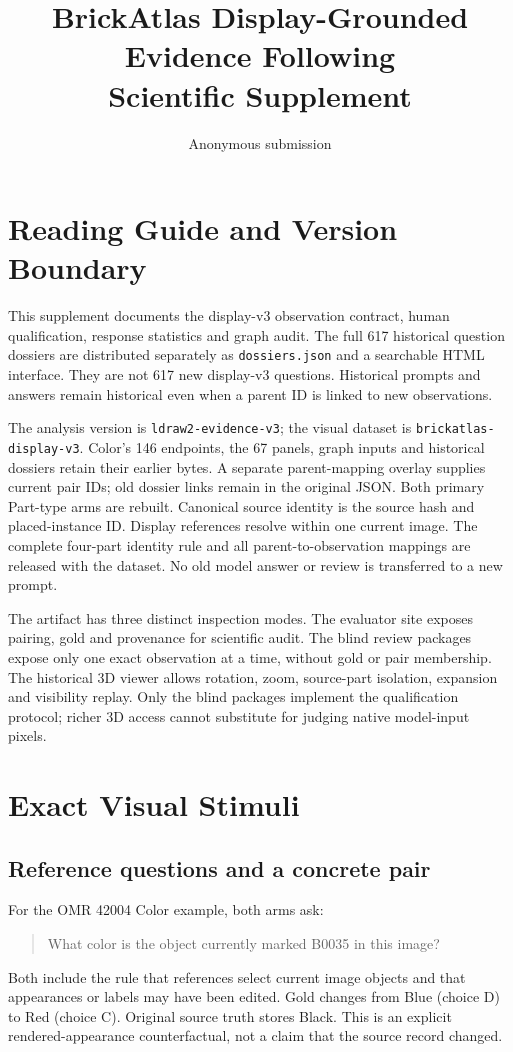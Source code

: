\documentclass[10pt,twocolumn,letterpaper]{article}
\title{BrickAtlas Display-Grounded Evidence Following\\Scientific Supplement}
\author{Anonymous submission}
\begin{document}
\maketitle
\raggedbottom

\section{Reading Guide and Version Boundary}
This supplement documents the display-v3 observation contract,
human qualification, response statistics and graph audit. The full
617 historical question dossiers are distributed separately as
\texttt{dossiers.json} and a searchable HTML interface. They are not
617 new display-v3 questions. Historical prompts and answers remain
historical even when a parent ID is linked to new observations.

The analysis version is \texttt{ldraw2-evidence-v3}; the visual dataset
is \texttt{brickatlas-display-v3}. Color's 146 endpoints, the 67 panels,
graph inputs and historical dossiers retain their earlier bytes.
A separate parent-mapping overlay supplies current pair IDs; old
dossier links remain in the original JSON. Both primary Part-type
arms are rebuilt. Canonical source identity is the
source hash and placed-instance ID. Display references resolve within
one current image. The complete four-part identity rule and all
parent-to-observation mappings are released with the dataset.
No old model answer or review is transferred to a new prompt.

The artifact has three distinct inspection modes. The evaluator site
exposes pairing, gold and provenance for scientific audit. The blind
review packages expose only one exact observation at a time, without
gold or pair membership. The historical 3D viewer allows rotation,
zoom, source-part isolation, expansion and visibility replay.
Only the blind packages implement the qualification protocol; richer
3D access cannot substitute for judging native model-input pixels.

\section{Exact Visual Stimuli}
\subsection{Reference questions and a concrete pair}
For the OMR 42004 Color example, both arms ask:
\begin{quote}\small
What color is the object currently marked B0035 in this image?
\end{quote}
Both include the rule that references select current image objects and
that appearances or labels may have been edited. Gold changes from
Blue (choice D) to Red (choice C). Original source truth stores Black.
This is an explicit rendered-appearance counterfactual, not a claim
that the source record changed.
\end{document}
